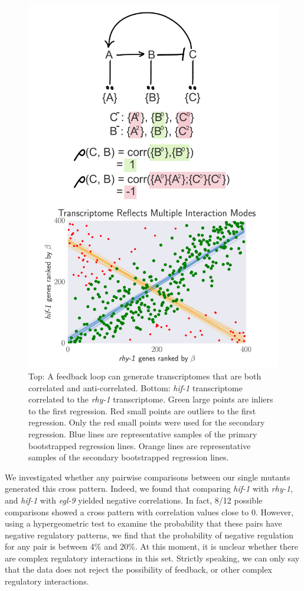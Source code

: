 \documentclass[9pt,twocolumn,twoside]{pnas-new}
\newcommand{\egl}{\emph{egl-9}}
\newcommand{\rhy}{\emph{rhy-1}}
\newcommand{\hif}{\emph{hif-1}}
\begin{document}
\begin{figure}[tbhp]
\centering
\includegraphics[width=.8\linewidth]{figs/correlative_genetics2.pdf}
\caption{Top: A feedback loop can generate transcriptomes that are both correlated and anti-correlated. Bottom: \hif{} transcriptome correlated to the \rhy{} transcriptome. Green large points are inliers to the first regression. Red small points are outliers to the first regression. Only the red small points were used for the secondary regression. Blue lines are representative samples of the primary bootstrapped regression lines. Orange lines are representative samples of the secondary bootstrapped regression lines.}
\label{fig:xpattern}
\end{figure}
We investigated whether any pairwise comparisons between our single mutants generated this cross pattern. Indeed, we found that comparing \hif{} with \rhy{}, and \hif{} with \egl{} yielded negative correlations. In fact, 8/12 possible comparisons showed a cross pattern with correlation values close to 0. However, using a hypergeometric test to examine the probability that these pairs have negative regulatory patterns, we find that the probability of negative regulation for any pair is between 4\% and 20\%. At this moment, it is unclear whether there are complex regulatory interactions in this set. Strictly speaking, we can only say that the data does not reject the possibility of feedback, or other complex regulatory interactions.
\end{document}
